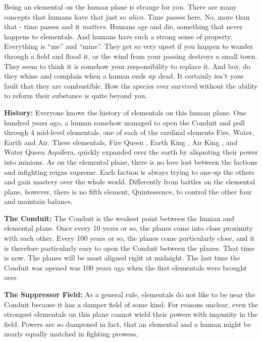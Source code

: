 \documentclass[blue]{elementals}
\begin{document}
\name{\bElemental{}}

Being an elemental on the human plane is strange for you. There are many concepts that humans have that just so \emph{alien}. Time passes here. No, more than that - time passes and it \emph{matters}. Humans age and die, something that never happens to elementals. And humans have such a strong sense of property. Everything is ``me'' and ``mine''.  They get so very upset if you happen to wander through a field and flood it, or the wind from your passing destroys a small town. They seem to think it is somehow your responsibility to replace it. And boy, do they whine and complain when a human ends up dead. It certainly isn't your fault that they are combustible. How the species ever survived without the ability to reform their substance is quite beyond you.

{\bf History:}
Everyone knows the history of elementals on this human plane. One hundred years ago, a human somehow managed to open the Conduit and pull through 4 mid-level elementals, one of each of the cardinal elements Fire, Water, Earth and Air. These elementals, Fire Queen \cQueen{}, Earth King \cEarthKing{}, Air King \cKing{}, and Water Queen Aquifera,  quickly expanded over the earth by aliquoting their power into minions. As on the elemental plane, there is no love lost between the factions and infighting reigns supreme. Each faction is always trying to one-up the others and gain mastery over the whole world.  Differently from battles on the elemental plane, however, there is no fifth element, Quintessence, to control the other four and maintain balance.

{\bf The Conduit:}
The Conduit is the weakest point between the human and elemental plane. Once every 10 years or so, the planes come into close proximity with each other. Every 100 years or so, the planes come particularly close, and it is therefore particularly easy to open the Conduit between the planes. That time is now. The planes will be most aligned right at midnight. The last time the Conduit was opened was 100 years ago when the first elementals were brought over.

{\bf The Suppressor Field:}
As a general rule, elementals do not like to be near the Conduit because it has a damper field of some kind. For reasons unclear, even the strongest elementals on this plane cannot wield their powers with impunity in the field. Powers are so dampened in fact, that an elemental and a human might be nearly equally matched in fighting prowess.
\end{document}
